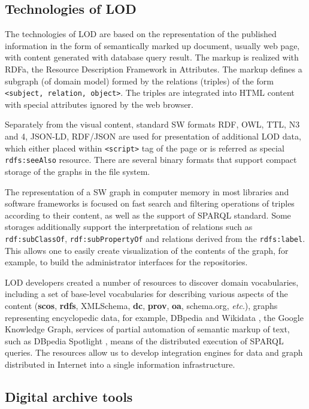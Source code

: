 \documentclass[conference,a4paper]{IEEEtran}
\begin{document}
\subsection{Technologies of LOD}

The technologies of LOD are based on the representation of the published information in the form of semantically marked up document, usually web page, with content generated with database query result.  The markup is realized with RDFa, the Resource Description Framework in Attributes.  The markup defines a subgraph (of domain model) formed by the relations (triples) of the form \texttt{<subject, relation, object>}.  The triples are integrated into HTML content with special attributes ignored by the web browser.

Separately from the visual content, standard SW formats RDF, OWL, TTL, N3 and 4, JSON-LD, RDF/JSON are used for presentation of additional LOD data, which either placed within \texttt{<script>} tag of the page or is referred as special \texttt{rdfs:seeAlso} resource.  There are several binary formats that support compact storage of the graphs in the file system.

The representation of a SW graph in computer memory in most libraries and software frameworks is focused on fast search and filtering operations of triples according to their content, as well as the support of SPARQL standard.  Some storages additionally support the interpretation of relations such as \texttt{rdf:subClassOf}, \texttt{rdf:subPropertyOf} and relations derived from the \texttt{rdfs:label}.  This allows one to easily create visualization of the contents of the graph, for example, to build the administrator interfaces for the repositories.

LOD developers created a number of resources to discover domain vocabularies, including a set of base-level vocabularies for describing various aspects of the content (\textbf{scos}, \textbf{rdfs}, XMLSchema, \textbf{dc}, \textbf{prov}, \textbf{oa}, schema.org, \emph{etc}.), graphs representing encyclopedic data, for example, DBpedia \cite{b3} and Wikidata \cite{b4}, the Google Knowledge Graph, services of partial automation of semantic markup of text, such as DBpedia Spotlight \cite{b5}, means of the distributed execution of SPARQL queries.  The resources allow us to develop integration engines for data and graph distributed in Internet into a single information infrastructure.

\subsection{Digital archive tools}
\end{document}
